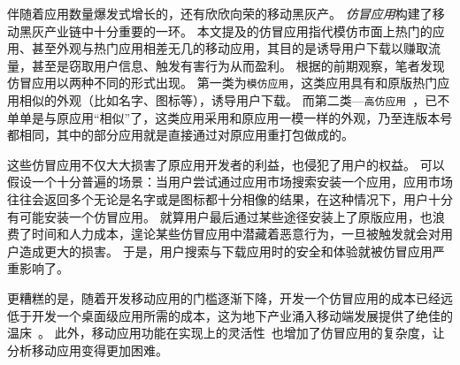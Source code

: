 伴随着应用数量爆发式增长的，还有欣欣向荣的移动黑灰产。
\emph{仿冒应用}构建了移动黑灰产业链中十分重要的一环。
本文提及的仿冒应用指代模仿市面上热门的应用、甚至外观与热门应用相差无几的移动应用，其目的是诱导用户下载以赚取流量，甚至是窃取用户信息、触发有害行为从而盈利。
根据的前期观察，笔者发现仿冒应用以两种不同的形式出现。
第一类为\texttt{模仿应用}，这类应用具有和原版热门应用相似的外观（比如名字、图标等），诱导用户下载。
而第二类---\texttt{高仿应用}~\cite{Andow2016ASO, luo2016repackage}，已不单单是与原应用``相似''了，这类应用采用和原应用一模一样的外观，乃至连版本号都相同，其中的部分应用就是直接通过对原应用重打包做成的。

这些仿冒应用不仅大大损害了原应用开发者的利益，也侵犯了用户的权益。
可以假设一个十分普遍的场景：当用户尝试通过应用市场搜索安装一个应用，应用市场往往会返回多个无论是名字或是图标都十分相像的结果，在这种情况下，用户十分有可能安装一个仿冒应用。
就算用户最后通过某些途径安装上了原版应用，也浪费了时间和人力成本，遑论某些仿冒应用中潜藏着恶意行为，一旦被触发就会对用户造成更大的损害。
于是，用户搜索与下载应用时的安全和体验就被仿冒应用严重影响了。

更糟糕的是，随着开发移动应用的门槛逐渐下降，开发一个仿冒应用的成本已经远低于开发一个桌面级应用所需的成本，这为地下产业涌入移动端发展提供了绝佳的温床~\cite{wasserman2010software}。
此外，移动应用功能在实现上的灵活性~\cite{storydroid}也增加了仿冒应用的复杂度，让分析移动应用变得更加困难。

